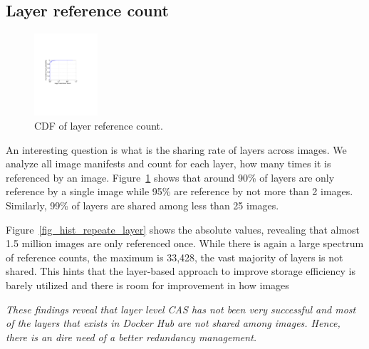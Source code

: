 \subsection{Layer reference count}

\begin{figure}
	\centering
	\includegraphics[width=0.21\textwidth]{graphs/shared-cnt-cdf.pdf}
	\caption{CDF of layer reference count.
	}
	\label{fig:ref_count}
\end{figure}

An interesting question is what is the sharing rate of layers across images.
We analyze all image manifests and count for each layer, how many times it
is referenced by an image. Figure~\ref{fig:ref_count} shows that around 90\%
of layers are only reference by a single image while 95\% are reference by not
more than 2 images. Similarly, 99\% of layers are shared among less than 25 images. 

Figure~\ref{fig_hist_repeate_layer} shows the absolute values, revealing that
almost 1.5 million images are only referenced once.   While there is again a large spectrum of reference counts, the maximum
is 33,428, the vast majority of layers is not shared. This hints that the
layer-based approach to improve storage efficiency is barely utilized and there
is room for improvement in how images

\emph{These findings reveal that layer level CAS has not been very successful
and most of the layers that exists in Docker Hub are not shared among images.
Hence, there is an dire need of a better redundancy management.}

